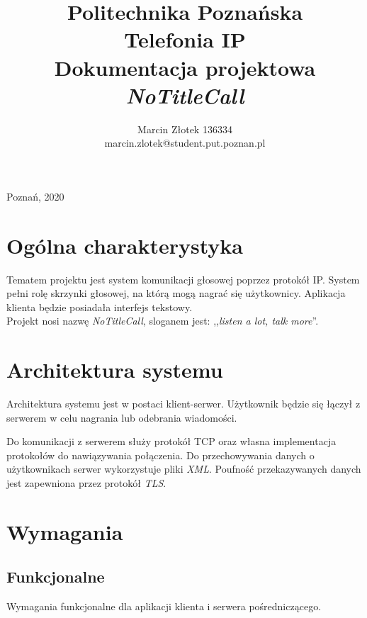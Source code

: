 \documentclass[12pt,a4paper]{article}
\title{\Large Politechnika Poznańska \vspace{3cm}\\ \textbf{\LARGE {Telefonia IP}}\\ \vspace{0.7cm} Dokumentacja projektowa \\ \vspace{0.2cm} \textit{NoTitleCall} }
\author{Marcin Złotek 136334 \\ marcin.zlotek@student.put.poznan.pl }
\date{}
\begin{document}
	\begin{titlepage}
		
		\clearpage
		
		\maketitle
		
		\thispagestyle{empty}
		\vfill
		\begin{center}
			\large Poznań, 2020
		\end{center}
	\end{titlepage}

	\tableofcontents
	\newpage
	
	\section{Ogólna charakterystyka}
	\par Tematem projektu jest system komunikacji głosowej poprzez protokół IP. System pełni rolę skrzynki głosowej, na którą mogą nagrać się użytkownicy. Aplikacja klienta będzie posiadała interfejs tekstowy. \\
	Projekt nosi nazwę \textit{NoTitleCall}, sloganem jest: ,,\textit{listen a lot, talk more}''. %
	
	\section{Architektura systemu}
	\par Architektura systemu jest w postaci klient-serwer. Użytkownik będzie się łączył z serwerem w celu nagrania lub odebrania wiadomości.
	\par Do komunikacji z serwerem służy protokół TCP oraz własna implementacja protokołów do nawiązywania połączenia. Do przechowywania danych o użytkownikach serwer wykorzystuje pliki \textit{XML}. Poufność przekazywanych danych jest zapewniona przez protokół \textit{TLS}.
	
	\section{Wymagania}
	
	\subsection{Funkcjonalne}
	\par Wymagania funkcjonalne dla aplikacji klienta i serwera pośredniczącego.
\end{document}
